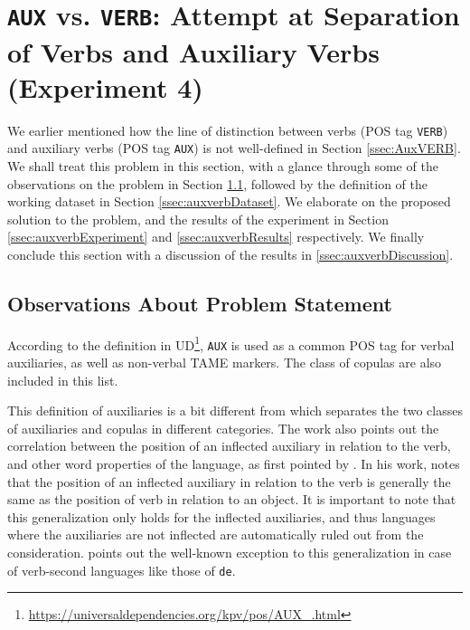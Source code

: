 \chapter{\texttt{AUX} vs. \texttt{VERB}: Attempt at Separation of Verbs and Auxiliary Verbs (Experiment 4)}
\label{chap:failures}

We earlier mentioned how the line of distinction between verbs (POS tag \texttt{VERB}) and auxiliary verbs (POS tag \texttt{AUX}) is not well-defined in Section \ref{ssec:AuxVERB}. We shall treat this problem in this section, with a glance through some of the observations on the problem in Section \ref{ssec:auxverbsObservations}, followed by the definition of the working dataset in Section \ref{ssec:auxverbDataset}. We elaborate on the proposed solution to the problem, and the results of the experiment in Section \ref{ssec:auxverbExperiment} and \ref{ssec:auxverbResults} respectively. We finally conclude this section with a discussion of the results in \ref{ssec:auxverbDiscussion}.

\section{Observations About Problem Statement}
\label{ssec:auxverbsObservations}

According to the definition in UD\footnote{\url{https://universaldependencies.org/kpv/pos/AUX\_.html}}, \verb|AUX| is used as a common POS tag for verbal auxiliaries, as well as non-verbal TAME markers. The class of copulas are also included in this list.

This definition of auxiliaries is a bit different from \cite{langtypology} which separates the two classes of auxiliaries and copulas in different categories. The work also points out the correlation between the position of an inflected auxiliary in relation to the verb, and other word properties of the language, as first pointed by \cite{greenberg1963some}. In his work, \citeauthor{greenberg1963some} notes that the position of an inflected auxiliary in relation to the verb is generally the same as the position of verb in relation to an object. It is important to note that this generalization only holds for the inflected auxiliaries, and thus languages where the auxiliaries are not inflected are automatically ruled out from the consideration. \citeauthor{langtypology} points out the well-known exception to this generalization in case of verb-second languages like those of \verb|de|.

